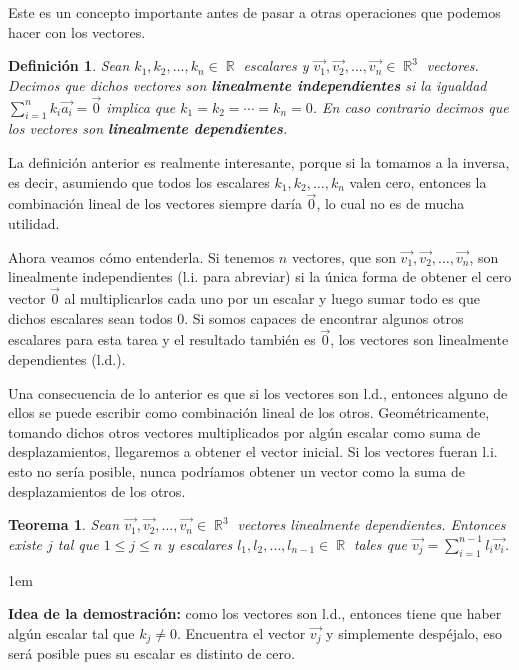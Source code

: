 \documentclass[12pt, fleqn]{report}                             %
\newenvironment{SmallIndentation}[1][0.75em]                    %
    {\begin{adjustwidth}{#1}{}\begin{footnotesize}}                 %
    {\end{footnotesize}\end{adjustwidth}}                           %
\newtheorem{Theorem}{Teorema}[section]                          %
\newtheorem{Definition}{Definición}[section]                    %
\DeclareMathOperator \Reals        {\mathbb{R}}                 %
\begin{document}
            Este es un concepto importante antes de pasar a otras operaciones que podemos hacer con los vectores.
            
            \begin{Definition}
                Sean $k_1, k_2, \ldots, k_n \in \Reals$ escalares y $\vec{v_1}, \vec{v_2}, \ldots, \vec{v_n} \in \Reals^3$ vectores. Decimos que dichos vectores son \textbf{linealmente independientes} si la igualdad $\displaystyle \sum_{i=1}^{n} k_i \vec{a_i} = \vec{0}$ implica que $k_1 = k_2 = \cdots = k_n = 0$. En caso contrario decimos que los vectores son \textbf{linealmente dependientes}.
            \end{Definition}
        
            La definición anterior es realmente interesante, porque si la tomamos a la inversa, es decir, asumiendo que todos los escalares $k_1, k_2, \ldots, k_n$ valen cero, entonces la combinación lineal de los vectores siempre daría $\vec{0}$, lo cual no es de mucha utilidad.
        
            Ahora veamos cómo entenderla. Si tenemos $n$ vectores, que son $\vec{v_1}, \vec{v_2}, \ldots, \vec{v_n}$, son linealmente independientes (l.i. para abreviar) si la única forma de obtener el cero vector $\vec{0}$ al multiplicarlos cada uno por un escalar y luego sumar todo es que dichos escalares sean todos 0. Si somos capaces de encontrar algunos otros escalares para esta tarea y el resultado también es $\vec{0}$, los vectores son linealmente dependientes (l.d.).
            
            Una consecuencia de lo anterior es que si los vectores son l.d., entonces alguno de ellos se puede escribir como combinación lineal de los otros. Geométricamente, tomando dichos otros vectores multiplicados por algún escalar como suma de desplazamientos, llegaremos a obtener el vector inicial. Si los vectores fueran l.i. esto no sería posible, nunca podríamos obtener un vector como la suma de desplazamientos de los otros.
            
            \begin{Theorem}
                Sean $\vec{v_1}, \vec{v_2}, \ldots, \vec{v_n} \in \Reals^3$ vectores linealmente dependientes. Entonces existe $j$ tal que $1 \leq j \leq n$ y escalares $l_1, l_2, \ldots, l_{n-1} \in \Reals$ tales que $\vec{v_j} = \displaystyle \sum_{i=1}^{n-1} l_i \vec{v_i}$.
            \end{Theorem}
        
            \begin{SmallIndentation}[1em]
                \textbf{Idea de la demostración:} como los vectores son l.d., entonces tiene que haber algún escalar tal que $k_j \neq 0$. Encuentra el vector $\vec{v_j}$ y simplemente despéjalo, eso será posible pues su escalar es distinto de cero.
            \end{SmallIndentation}
            
\end{document}
